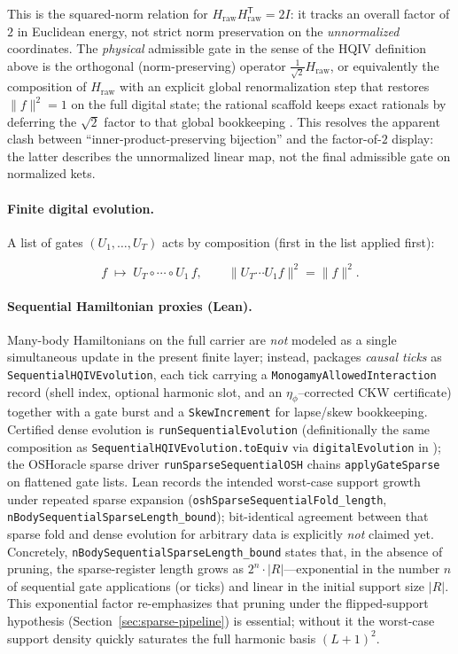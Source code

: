 \documentclass[11pt,a4paper]{article}
\theoremstyle{remark}
\begin{document}
This is the squared-norm relation for $H_{\mathrm{raw}}H_{\mathrm{raw}}^{\mathsf T}=2I$: it tracks an overall factor of $2$ in Euclidean energy, not strict norm preservation on the \emph{unnormalized} coordinates. The \emph{physical} admissible gate in the sense of the HQIV definition above is the orthogonal (norm-preserving) operator $\tfrac{1}{\sqrt{2}}H_{\mathrm{raw}}$, or equivalently the composition of $H_{\mathrm{raw}}$ with an explicit global renormalization step that restores $\|f\|^2=1$ on the full digital state; the rational scaffold keeps exact rationals by deferring the $\sqrt{2}$ factor to that global bookkeeping \cite{hadamardMatrixMathWorld}. This resolves the apparent clash between ``inner-product-preserving bijection'' and the factor-of-$2$ display: the latter describes the unnormalized linear map, not the final admissible gate on normalized kets.

\paragraph{Finite digital evolution.}
A list of gates $(U_1,\ldots,U_T)$ acts by composition (first in the list applied first):

\begin{equation}
  f \;\mapsto\; U_T\circ\cdots\circ U_1\,f,
  \qquad
  \|U_T\cdots U_1 f\|^2=\|f\|^2.
\end{equation}

\paragraph{Sequential Hamiltonian proxies (Lean).}
Many-body Hamiltonians on the full carrier are \emph{not} modeled as a single simultaneous update in the present finite layer; instead,  packages \emph{causal ticks} as \texttt{SequentialHQIVEvolution}, each tick carrying a \texttt{MonogamyAllowedInteraction} record (shell index, optional harmonic slot, and an $\eta_\phi$--corrected CKW certificate) together with a gate burst and a \texttt{SkewIncrement} for lapse/skew bookkeeping.
Certified dense evolution is \texttt{runSequentialEvolution} (definitionally the same composition as \texttt{SequentialHQIVEvolution.toEquiv} via \texttt{digitalEvolution} in ); the OSHoracle sparse driver \texttt{runSparseSequentialOSH} chains \texttt{applyGateSparse} on flattened gate lists.
Lean records the intended worst-case support growth under repeated sparse expansion (\texttt{oshSparseSequentialFold\_length}, \texttt{nBodySequentialSparseLength\_bound}); bit-identical agreement between that sparse fold and dense evolution for arbitrary data is explicitly \emph{not} claimed yet.
Concretely, \texttt{nBodySequentialSparseLength\_bound} states that, in the absence of pruning, the sparse-register length grows as $2^{n}\cdot |R|$---exponential in the number $n$ of sequential gate applications (or ticks) and linear in the initial support size $|R|$. This exponential factor re-emphasizes that pruning under the flipped-support hypothesis (Section~\ref{sec:sparse-pipeline}) is essential; without it the worst-case support density quickly saturates the full harmonic basis $(L+1)^2$.
\end{document}
